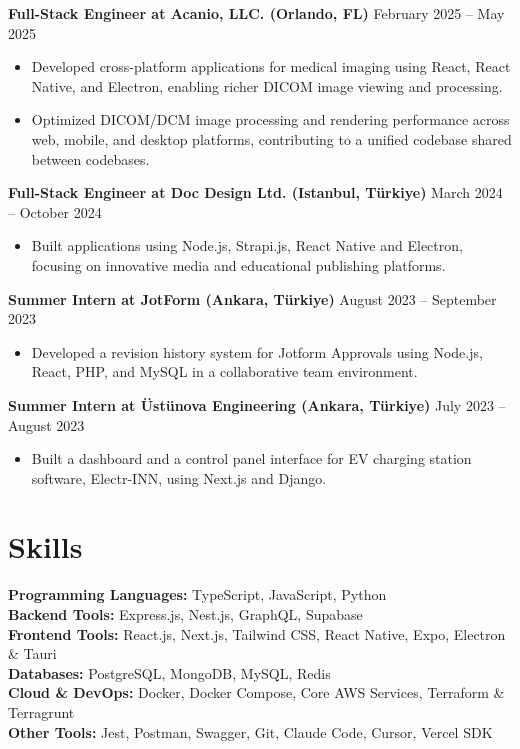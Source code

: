 \documentclass[10pt,a4paper]{extarticle}
\begin{document}
\noindent\textbf{Full-Stack Engineer at Acanio, LLC. (Orlando, FL)} \hfill February 2025 -- May 2025
\begin{itemize}[leftmargin=*,noitemsep,topsep=0pt]
    \item Developed cross-platform applications for medical imaging using React, React Native, and Electron, enabling richer DICOM image viewing and processing.
    \item Optimized DICOM/DCM image processing and rendering performance across web, mobile, and desktop platforms, contributing to a unified codebase shared between codebases.
\end{itemize}

\noindent\textbf{Full-Stack Engineer at Doc Design Ltd. (Istanbul, Türkiye)} \hfill March 2024 -- October 2024
\begin{itemize}[leftmargin=*,noitemsep,topsep=0pt]
    \item Built applications using Node.js, Strapi.js, React Native and Electron, focusing on innovative media and educational publishing platforms.
\end{itemize}

\noindent\textbf{Summer Intern at JotForm (Ankara, Türkiye)} \hfill August 2023 -- September 2023
\begin{itemize}[leftmargin=*,noitemsep,topsep=0pt]
    \item Developed a revision history system for Jotform Approvals using Node.js, React, PHP, and MySQL in a collaborative team environment.
\end{itemize}

\noindent\textbf{Summer Intern at Üstünova Engineering (Ankara, Türkiye)} \hfill July 2023 -- August 2023
\begin{itemize}[leftmargin=*,noitemsep,topsep=0pt]
    \item Built a dashboard and a control panel interface for EV charging station software, Electr-INN, using Next.js and Django.
\end{itemize}

\section{Skills}
\textbf{Programming Languages:} TypeScript, JavaScript, Python \\
\textbf{Backend Tools:} Express.js, Nest.js, GraphQL, Supabase \\
\textbf{Frontend Tools:} React.js, Next.js, Tailwind CSS, React Native, Expo, Electron \& Tauri \\
\textbf{Databases:} PostgreSQL, MongoDB, MySQL, Redis \\
\textbf{Cloud \& DevOps:} Docker, Docker Compose, Core AWS Services, Terraform \& Terragrunt \\
\textbf{Other Tools:} Jest, Postman, Swagger, Git, Claude Code, Cursor, Vercel SDK
\end{document}
